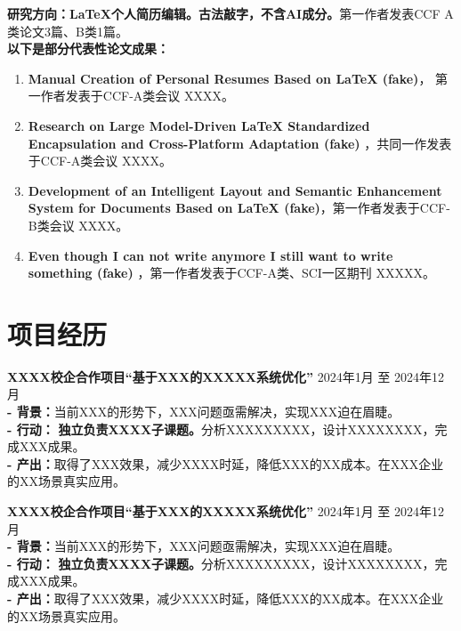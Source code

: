     \textbf{研究方向：}\textbf{LaTeX个人简历编辑。古法敲字，不含AI成分。}第一作者发表CCF A类论文3篇、B类1篇。\\\textbf{以下是部分代表性论文成果：} 
    \begin{enumerate}[itemsep=-0.5ex]
        \item \textbf{Manual Creation of Personal Resumes Based on LaTeX (fake)}，
    第一作者发表于CCF-A类会议 XXXX。
    \item \textbf{Research on Large Model-Driven LaTeX Standardized Encapsulation and Cross-Platform Adaptation (fake)} ，共同一作发表于CCF-A类会议 XXXX。
    \item \textbf{Development of an Intelligent Layout and Semantic Enhancement System for Documents Based on LaTeX (fake)}，第一作者发表于CCF-B类会议 XXXX。
    \item \textbf{Even though I can not write anymore I still want to write something (fake)} ，第一作者发表于CCF-A类、SCI一区期刊 XXXXX。
    \end{enumerate}


    \section{\makebox[\widthof{\faWrench}][c]{\color{USTC_Blue}{\faWrench}}\quad 项目经历}
    \vspace{0.5em}
    {\large{\textbf{XXXX校企合作项目“基于XXX的XXXXX系统优化”}}} \hfill 2024年1月 至 2024年12月 \\
    \textbf{- 背景：}当前XXX的形势下，XXX问题亟需解决，实现XXX迫在眉睫。\\
    \textbf{- 行动：} \textbf{独立负责XXXX子课题。}分析XXXXXXXXX，设计XXXXXXXX，完成XXX成果。\\
    \textbf{- 产出：}取得了XXX效果，减少XXXX时延，降低XXX的XX成本。在XXX企业的XX场景真实应用。
    
    \vspace{0.4em}
      {\large{\textbf{XXXX校企合作项目“基于XXX的XXXXX系统优化”}}} \hfill 2024年1月 至 2024年12月 \\
    \textbf{- 背景：}当前XXX的形势下，XXX问题亟需解决，实现XXX迫在眉睫。\\
    \textbf{- 行动：} \textbf{独立负责XXXX子课题。}分析XXXXXXXXX，设计XXXXXXXX，完成XXX成果。\\
    \textbf{- 产出：}取得了XXX效果，减少XXXX时延，降低XXX的XX成本。在XXX企业的XX场景真实应用。

